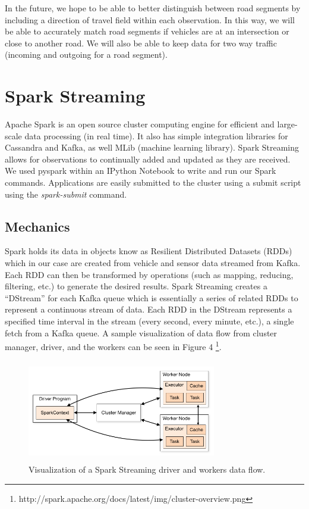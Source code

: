 \documentclass{vldb}
\begin{document}
In the future, we hope to be able to better distinguish between road segments by including a direction of travel field within each observation. In this way, we will be able to accurately match road segments if vehicles are at an intersection or close to another road. We will also be able to keep data for two way traffic (incoming and outgoing for a road segment). 


\section{Spark Streaming}
Apache Spark is an open source cluster computing engine for efficient and large-scale data processing (in real time). It also has simple integration libraries for Cassandra and Kafka, as well MLib (machine learning library). Spark Streaming allows for observations to continually added and updated as they are received. We used pyspark within an IPython Notebook to write and run our Spark commands. Applications are easily submitted to the cluster using a submit script using the \textit{spark-submit} command.


\subsection{Mechanics}
Spark holds its data in objects know as Resilient Distributed Datasets (RDDs) which in our case are created from vehicle and sensor data streamed from Kafka. Each RDD can then be transformed by operations (such as mapping, reducing, filtering, etc.) to generate the desired results. Spark Streaming creates a “DStream” for each Kafka queue which is essentially a series of related RDDs to represent a continuous stream of data. Each RDD in the DStream represents a specified time interval in the stream (every second, every minute, etc.), a single fetch from a Kafka queue. A sample visualization of data flow from cluster manager, driver, and the workers can be seen in Figure 4 \footnote{http://spark.apache.org/docs/latest/img/cluster-overview.png}. 

\begin{figure}
\centering
\includegraphics[width=3.25in,height=1.75in]{dstream}
\caption{Visualization of a Spark Streaming driver and workers data flow.}
\label{fig:dstream}
\end{figure}
\end{document}
